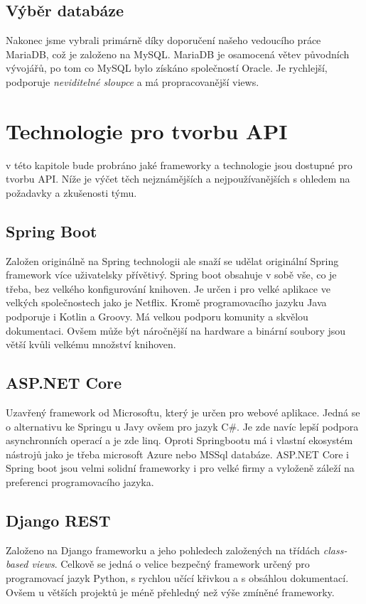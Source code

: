 \subsection{Výběr databáze}\label{sec:data_storage:summary}
Nakonec jsme vybrali primárně díky doporučení našeho vedoucího práce MariaDB, což je založeno na MySQL. MariaDB je osamocená větev původních vývojářů, po tom co MySQL bylo získáno společností Oracle. Je rychlejší, podporuje \textit{neviditelné sloupce} a má propracovanější views.

\section{Technologie pro tvorbu API}\label{sec:api_technologies}
v této kapitole bude probráno jaké frameworky a technologie jsou dostupné pro tvorbu API. Níže je výčet těch nejznámějších a nejpoužívanějších s ohledem na požadavky a zkušenosti týmu.

\subsection{Spring Boot}\label{sec:api_technologies:spring}
Založen originálně na Spring technologii ale snaží se udělat originální Spring framework více uživatelsky přívětivý. Spring boot obsahuje v sobě vše, co je třeba, bez velkého konfigurování knihoven. Je určen i pro velké aplikace ve velkých společnostech jako je Netflix. Kromě programovacího jazyku Java podporuje i Kotlin a Groovy. Má velkou podporu komunity a skvělou dokumentaci. Ovšem může být náročnější na hardware a binární soubory jsou větší kvůli velkému množství knihoven.

\subsection{ASP.NET Core}\label{sec:api_technologies:asp}
Uzavřený framework od Microsoftu, který je určen pro webové aplikace. Jedná se o alternativu ke Springu u Javy ovšem pro jazyk C\#. Je zde navíc lepší podpora asynchronních operací a je zde \gls{linq}. Oproti Springbootu má i vlastní ekosystém nástrojů jako je třeba microsoft Azure nebo MSSql databáze. ASP.NET Core i Spring boot jsou velmi solidní frameworky i pro velké firmy a vyloženě záleží na preferenci programovacího jazyka.

\subsection{Django REST}\label{sec:api_technologies:django}
Založeno na Django frameworku a jeho pohledech založených na třídách \textit{class-based views}. Celkově se jedná o velice bezpečný framework určený pro programovací jazyk Python, s rychlou učící křivkou a s obsáhlou dokumentací. Ovšem u větších projektů je méně přehledný než výše zmíněné frameworky.

